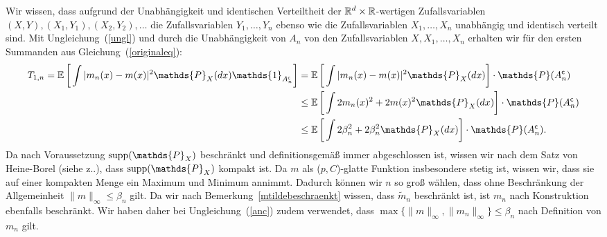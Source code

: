 Wir wissen, dass aufgrund der Unabhängigkeit und identischen Verteiltheit der $\mathbb{R}^d \times \mathbb{R}$-wertigen Zufallsvariablen  $(X, Y), (X_1, Y_1), (X_2, Y_2), \dots$ die Zufallsvariablen $Y_1,\dots,Y_n$ ebenso wie die Zufallsvariablen $X_1,\dots,X_n$ unabhängig und identisch verteilt sind. 
Mit Ungleichung~(\ref{ungl}) und durch die Unabhängigkeit von $A_n$ von den Zufallsvariablen $X, X_1, \dots, X_n$ erhalten wir für den ersten Summanden aus Gleichung~(\ref{originaleq}):
\begin{equation}
\label{anc}
\begin{split}
 T_{1,n} = \E \bigg[\int |m_n(x) - m(x)|^2 \mathds{P}_X(dx) \mathds{1}_{A_n^{\mathsf{c}}}\bigg] & =  \E \bigg[\int |m_n(x) - m(x)|^2 \mathds{P}_X(dx) \bigg] \cdot \mathds{P}(A_n^{\mathsf{c}}) \\
 & \leq \E \bigg[\int 2m_n(x)^2 + 2m(x)^2 \mathds{P}_X(dx)\bigg] \cdot \mathds{P}(A_n^{\mathsf{c}})\\
 & \leq \E \bigg[\int  2\beta_n^2 + 2\beta_n^2 \mathds{P}_X(dx)\bigg] \cdot \mathds{P}(A_n^{\mathsf{c}}).
\end{split}
\end{equation}
Da nach Voraussetzung $\supp(\mathds{P}_X)$ beschränkt und definitionsgemäß immer abgeschlossen ist, wissen wir nach dem Satz von Heine-Borel (siehe z.\@B.\@ \cite[Satz 5]{forster2016}), dass $\supp(\mathds{P}_X)$ kompakt ist. Da $m$ als ($p,C$)-glatte Funktion insbesondere stetig ist, wissen wir, dass sie auf einer kompakten Menge ein Maximum und Minimum annimmt. Dadurch können wir $n$ so groß wählen, dass ohne Beschränkung der Allgemeinheit $\|m\|_{\infty} \leq \beta_n$ gilt.
Da wir nach Bemerkung~\ref{mtildebeschraenkt} wissen, dass $\tilde{m}_n$ beschränkt ist, ist $m_n$ nach Konstruktion ebenfalls beschränkt. Wir haben daher bei Ungleichung~(\ref{anc}) zudem verwendet, dass $\max\{\|m\|_{\infty}, \|m_n\|_{\infty}\} \leq \beta_n$ nach Definition von $m_n$ gilt. 

